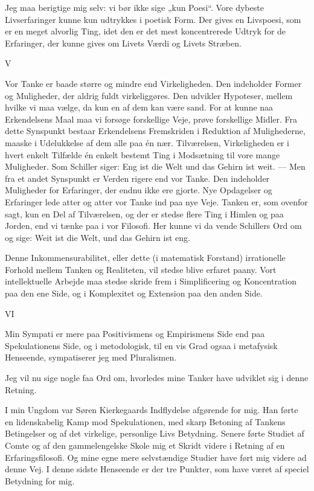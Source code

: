 \documentclass[12pt,a4paper,openany]{book}
\newcommand{\opage}[1]{\marginnote{\footnotesize\textit{[#1]}}}
\begin{document}
Jeg maa berigtige mig selv: vi bør ikke sige „kun Poesi“.
Vore dybeste Livserfaringer kunne kun udtrykkes i poetisk Form.
Der gives en Livspoesi, som er en meget alvorlig Ting, idet
den er det mest koncentrerede Udtryk for de Erfaringer, der
kunne gives om Livets Værdi og Livets Stræben.

\begin{center}V\end{center}


Vor Tanke er baade større og mindre end Virkeligheden.
Den indeholder Former og Muligheder, der aldrig fuldt virkeliggøres.
Den udvikler Hypoteser, mellem hvilke vi maa vælge,
da kun en af dem kan være sand. For at kunne naa Erkendelsens
Maal maa vi forsøge forskellige Veje, prøve forskellige
Midler. Fra dette Synspunkt bestaar Erkendelsens Fremskriden
i Reduktion af Mulighederne, maaske i Udelukkelse af dem
alle paa én nær. Tilværelsen, Virkeligheden er i hvert enkelt
Tilfælde én enkelt bestemt Ting i Modsætning til vore mange
Muligheder. Som Schiller siger: Eng ist die Welt und das Gehirn
ist weit. --- Men fra et andet Synspunkt er Verden rigere
end vor Tanke. Den indeholder Muligheder for Erfaringer, der
endnu ikke ere gjorte. Nye Opdagelser og Erfaringer lede atter
og atter vor Tanke ind paa nye Veje. Tanken er, som ovenfor
sagt, kun en Del af Tilværelsen, og der er stedse flere Ting i
Himlen og paa Jorden, end vi tænke paa i vor Filosofi. Her
kunne vi da vende Schillers Ord om og sige: Weit ist die
Welt, und das Gehirn ist eng.

Denne Inkommensurabilitet, eller dette (i matematisk Forstand)
irrationelle Forhold mellem Tanken og Realiteten, vil stedse
\setcounter{footnote}{0}%
\opage{24}blive erfaret paany. Vort intellektuelle Arbejde maa stedse skride
frem i Simplificering og Koncentration paa den ene Side, og i
Komplexitet og Extension paa den anden Side.

\begin{center}VI\end{center}


Min Sympati er mere paa Positivismens og Empirismens
Side end paa Spekulationens Side, og i metodologisk, til en vis
Grad ogsaa i metafysisk Henseende, sympatiserer jeg med Pluralismen.


Jeg vil nu sige nogle faa Ord om, hvorledes mine Tanker
have udviklet sig i denne Retning.

I min Ungdom var Søren Kierkegaards Indflydelse afgørende
for mig. Han førte en lidenskabelig Kamp mod Spekulationen,
med skarp Betoning af Tankens Betingelser og af det virkelige,
personlige Livs Betydning. Senere førte Studiet af Comte og af
den gammelengelske Skole mig et Skridt videre i Retning af en
Erfaringsfilosofi. Og mine egne mere selvstændige Studier have
ført mig videre ad denne Vej. I denne sidste Henseende er der
tre Punkter, som have været af speciel Betydning for mig.
\end{document}
